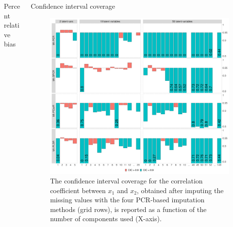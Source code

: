 \documentclass{beamer}\usepackage[]{graphicx}\usepackage[]{xcolor}
\makeatletter
\def\maxwidth{ %
  \ifdim\Gin@nat@width>\linewidth
    \linewidth
  \else
    \Gin@nat@width
  \fi
}
\newenvironment{knitrout}{}{} %
\makeatother
\begin{document}
\begin{frame}[fragile]
\begin{columns}
\begin{column}{.46\textwidth}
\begin{block}{Percent relative bias}
    \end{block}
    
  \end{column}  


  \begin{column}{.46\textwidth}

    \begin{block}{Confidence interval coverage}
      
      \begin{figure}
        \centering
\begin{knitrout}
\color{fgcolor}

{\centering \includegraphics[width=\maxwidth]{figure/plot-cic-1} 

}


\end{knitrout}
          \caption{
            \label{fig:prb} 
            The confidence interval coverage for the correlation coefficient between $x_1$ and $x_2$, obtained after imputing the missing values with the four PCR-based imputation methods (grid rows), is reported as a function of the number of components used (X-axis).
            }
        \end{figure}
    
    \end{block}
    \end{column}


\end{columns}
\end{frame}
\end{document}
